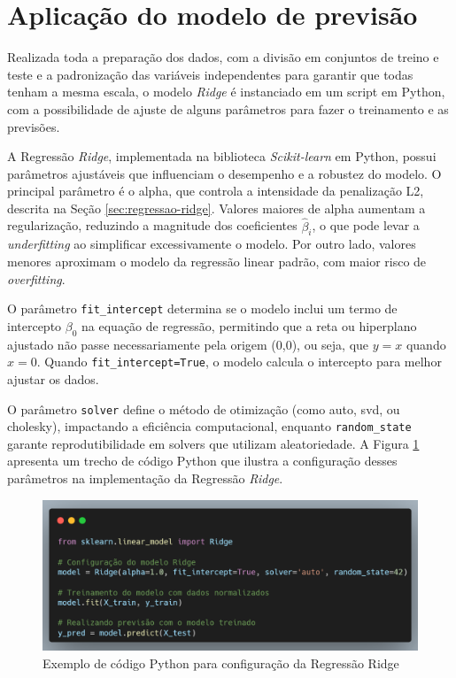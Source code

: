 \section{Aplicação do modelo de previsão}
\label{sec:aplicacao_modelo_previsao}

Realizada toda a preparação dos dados, com a divisão em conjuntos de treino e teste e a padronização das variáveis independentes para garantir que todas tenham a mesma escala, o modelo \textit{Ridge} é instanciado em um script em Python, com a possibilidade de ajuste de alguns parâmetros para fazer o treinamento e as previsões.

A Regressão \textit{Ridge}, implementada na biblioteca \textit{Scikit-learn} em Python, possui parâmetros ajustáveis que influenciam o desempenho e a robustez do modelo. O principal parâmetro é o alpha, que controla a intensidade da penalização L2, descrita na Seção \ref{sec:regressao-ridge}. Valores maiores de alpha aumentam a regularização, reduzindo a magnitude dos coeficientes $\hat{\beta}_i$, o que pode levar a \textit{underfitting} ao simplificar excessivamente o modelo. Por outro lado, valores menores aproximam o modelo da regressão linear padrão, com maior risco de \textit{overfitting}. 

O parâmetro \texttt{fit\_intercept} determina se o modelo inclui um termo de intercepto $\beta_0$ na equação de regressão, permitindo que a reta ou hiperplano ajustado não passe necessariamente pela origem (0,0), ou seja, que $y = x$ quando $x = 0$. Quando \texttt{fit\_intercept=True}, o modelo calcula o intercepto para melhor ajustar os dados. 

O parâmetro \texttt{solver} define o método de otimização (como auto, svd, ou cholesky), impactando a eficiência computacional, enquanto \texttt{random\_state} garante reprodutibilidade em solvers que utilizam aleatoriedade. A Figura \ref{fig:exemplo_codigo_ridge} apresenta um trecho de código Python que ilustra a configuração desses parâmetros na implementação da Regressão \textit{Ridge}.

\begin{figure}[H]
	\caption{\label{fig:exemplo_codigo_ridge} Exemplo de código Python para configuração da Regressão Ridge}
	\begin{center}
		\includegraphics[scale=0.3]{figuras/carbon.png}
	\end{center}
\end{figure}

